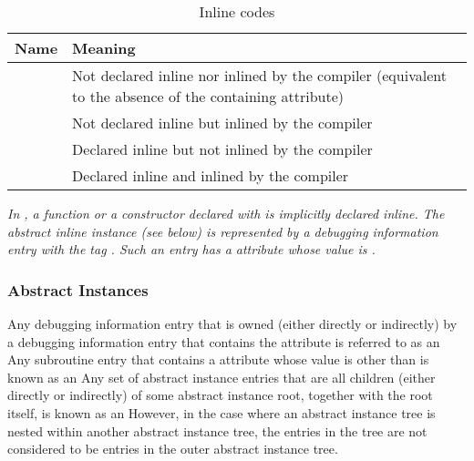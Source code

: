 \begin{table}[here]
\centering
\caption{Inline codes}
\label{tab:inlinecodes}
\begin{tabular}{l|p{8cm}}
\hline
Name&Meaning\\ \hline
\DWINLnotinlinedTARG{} & Not declared inline nor inlined by the
  \mbox{compiler} (equivalent to the absence of the
  containing \DWATinline{} attribute) \\
\DWINLinlinedTARG{} & Not declared inline but inlined by the \mbox{compiler} \\
\DWINLdeclarednotinlinedTARG{} & Declared inline but 
  not inlined by the \mbox{compiler} \\
\DWINLdeclaredinlinedTARG{} & Declared inline and inlined by the 
  \mbox{compiler} \\
\hline
\end{tabular}
\end{table}

\textit{In , a function or a constructor declared with
 is implicitly declared inline. The abstract inline
instance (see below) is represented by a debugging information
entry with the tag \DWTAGsubprogram. Such an entry has a
\DWATinline{} attribute whose value is \DWINLinlined.}


\subsubsection{Abstract Instances}
\label{chap:abstractinstances}
Any debugging information entry that is owned (either
\hypertarget{chap:DWATinlineabstracttinstance}{}
directly or indirectly) by a debugging information entry
that contains the 
\DWATinline{} attribute is referred to
as an  
Any subroutine entry
that contains 
a \DWATinline{} attribute whose value is other
than \DWINLnotinlined{}
is known as 
an  
Any set of abstract instance entries that are all
children (either directly or indirectly) of some abstract
instance root, together with the root itself, is known as
an  However, in the case where
an abstract instance tree is nested within another abstract
instance tree, the entries in the 
tree are not considered to be entries in the outer abstract
instance tree.


